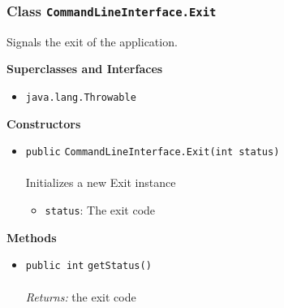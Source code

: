 \subsubsection{Class \lstinline|CommandLineInterface.Exit|}
Signals the exit of the application. \\
\noindent\begin{minipage}[t]{5cm}
\vspace{0.3em}
\hspace*{2em}
\vspace{0.3em}
\end{minipage}



\textbf{\sffamily Superclasses and Interfaces}
\begin{itemize}
\item \lstinline|java.lang.Throwable|
\end{itemize}


\textbf{\sffamily Constructors}
\begin{itemize}
\item \lstinline|public| \lstinline|CommandLineInterface.Exit|\lstinline|(int status)|\\ \\[-0.6em]
Initializes a new Exit instance
\begin{itemize}
\item \lstinline|status|: The exit code
\end{itemize}



\end{itemize}


\textbf{\sffamily Methods}
\begin{itemize}
\item \lstinline|public int| \lstinline|getStatus|\lstinline|()|\\ \\[-0.6em]
\emph{Returns:} the exit code



\end{itemize}

